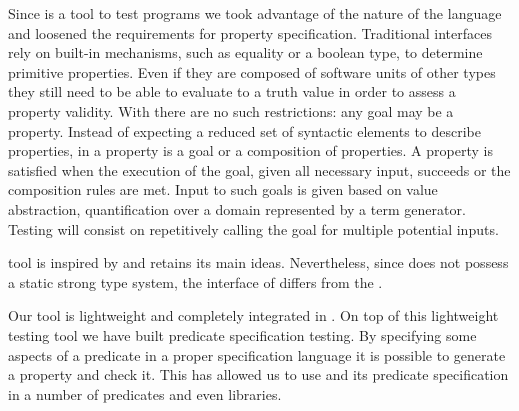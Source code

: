 Since \plqc{} is a tool to test \Prolog{} programs we took advantage of
the nature of the language and loosened the requirements for property
specification.
%
Traditional interfaces rely on built-in mechanisms, such as equality or
a boolean type, to determine primitive properties.
%
Even if they are composed of software units of other types they still
need to be able to evaluate to a truth value in order to assess a
property validity.
%
With \Prolog{} there are no such restrictions: any goal may be a property.
%
Instead of expecting a reduced set of syntactic elements to describe
properties, in \plqc{} a property is a goal or a composition of
properties.
A property is satisfied when the execution of the goal, given all
necessary input, succeeds or the composition rules are met.
%
Input to such goals is given based on \plqc{} value abstraction,
quantification over a domain represented by a term generator.
%
%
Testing will consist on repetitively calling the goal for multiple
potential inputs.


\plqc{} tool is inspired by \QuickCheck{} and retains its main
ideas.
%
%
Nevertheless, since \Prolog{} does not possess a static strong
type system, the interface of \plqc{} differs from the \Haskell{}
\QuickCheck{}.


Our tool is
lightweight and completely integrated in \Prolog{}.
%
On top of this lightweight testing tool we have built predicate
specification testing.
%
By specifying some aspects of a predicate in a proper specification
language it is possible to generate a \plqc{} property and check it.
%
This has allowed us to  use \plqc{} and its predicate specification in a number of
predicates and even libraries.






